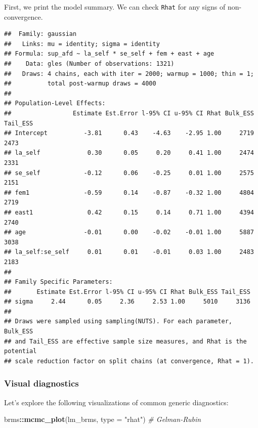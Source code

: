 \documentclass[
  11pt,
]{article}
\newenvironment{Shaded}{\begin{snugshade}}{\end{snugshade}}
\newcommand{\AttributeTok}[1]{\textcolor[rgb]{0.13,0.29,0.53}{#1}}
\newcommand{\CommentTok}[1]{\textcolor[rgb]{0.56,0.35,0.01}{\textit{#1}}}
\newcommand{\FunctionTok}[1]{\textcolor[rgb]{0.13,0.29,0.53}{\textbf{#1}}}
\newcommand{\NormalTok}[1]{#1}
\newcommand{\SpecialCharTok}[1]{\textcolor[rgb]{0.81,0.36,0.00}{\textbf{#1}}}
\newcommand{\StringTok}[1]{\textcolor[rgb]{0.31,0.60,0.02}{#1}}
\begin{document}
First, we print the model summary. We can check \texttt{Rhat} for any signs of non-convergence.

\begin{verbatim}
##  Family: gaussian 
##   Links: mu = identity; sigma = identity 
## Formula: sup_afd ~ la_self * se_self + fem + east + age 
##    Data: gles (Number of observations: 1321) 
##   Draws: 4 chains, each with iter = 2000; warmup = 1000; thin = 1;
##          total post-warmup draws = 4000
## 
## Population-Level Effects: 
##                 Estimate Est.Error l-95% CI u-95% CI Rhat Bulk_ESS Tail_ESS
## Intercept          -3.81      0.43    -4.63    -2.95 1.00     2719     2473
## la_self             0.30      0.05     0.20     0.41 1.00     2474     2331
## se_self            -0.12      0.06    -0.25     0.01 1.00     2575     2151
## fem1               -0.59      0.14    -0.87    -0.32 1.00     4804     2719
## east1               0.42      0.15     0.14     0.71 1.00     4394     2740
## age                -0.01      0.00    -0.02    -0.01 1.00     5887     3038
## la_self:se_self     0.01      0.01    -0.01     0.03 1.00     2483     2183
## 
## Family Specific Parameters: 
##       Estimate Est.Error l-95% CI u-95% CI Rhat Bulk_ESS Tail_ESS
## sigma     2.44      0.05     2.36     2.53 1.00     5010     3136
## 
## Draws were sampled using sampling(NUTS). For each parameter, Bulk_ESS
## and Tail_ESS are effective sample size measures, and Rhat is the potential
## scale reduction factor on split chains (at convergence, Rhat = 1).
\end{verbatim}

\hypertarget{visual-diagnostics}{%
\subsubsection{Visual diagnostics}\label{visual-diagnostics}}

Let's explore the following visualizations of common generic diagnostics:

\begin{Shaded}
\begin{Highlighting}[]
\NormalTok{brms}\SpecialCharTok{::}\FunctionTok{mcmc\_plot}\NormalTok{(lm\_brms, }\AttributeTok{type =} \StringTok{"rhat"}\NormalTok{)  }\CommentTok{\# Gelman{-}Rubin }
\end{Highlighting}
\end{Shaded}
\end{document}

